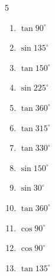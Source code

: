 \begin{multicols}{5}
\begin{enumerate}
  \item $\displaystyle \tan{90^\circ}$

        \phantom{$\displaystyle なし$}

  \item $\displaystyle \sin{135^\circ}$


  \item $\displaystyle \tan{150^\circ}$


\columnbreak %

\resetques

  \item $\displaystyle \sin{225^\circ}$


  \item $\displaystyle \tan{360^\circ}$

        \phantom{$\displaystyle =0$}

  \item $\displaystyle \tan{315^\circ}$

        \phantom{$\displaystyle =-1$}

  \item $\displaystyle \tan{330^\circ}$


  \item $\displaystyle \sin{150^\circ}$


  \item $\displaystyle \sin{30^\circ}$


  \item $\displaystyle \tan{360^\circ}$

        \phantom{$\displaystyle =0$}

  \item $\displaystyle \cos{90^\circ}$

        \phantom{$\displaystyle =0$}

  \item $\displaystyle \cos{90^\circ}$

        \phantom{$\displaystyle =0$}

  \item $\displaystyle \tan{135^\circ}$


\end{enumerate}
\end{multicols}
